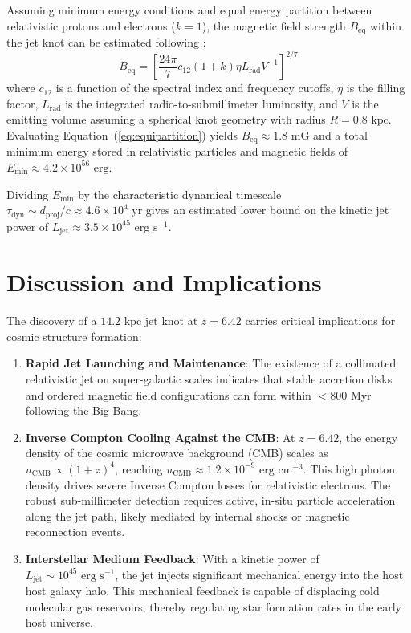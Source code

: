 \documentclass[twocolumn]{aastex631}
\begin{document}
Assuming minimum energy conditions and equal energy partition between relativistic protons and electrons ($k = 1$), the magnetic field strength $B_{\mathrm{eq}}$ within the jet knot can be estimated following \citet{Thorne2025}:
\begin{equation} \label{eq:equipartition}
B_{\mathrm{eq}} = \left[ \frac{24\pi}{7} c_{12} (1+k) \eta L_{\mathrm{rad}} V^{-1} \right]^{2/7}
\end{equation}
where $c_{12}$ is a function of the spectral index and frequency cutoffs, $\eta$ is the filling factor, $L_{\mathrm{rad}}$ is the integrated radio-to-submillimeter luminosity, and $V$ is the emitting volume assuming a spherical knot geometry with radius $R = 0.8\text{ kpc}$. Evaluating Equation~(\ref{eq:equipartition}) yields $B_{\mathrm{eq}} \approx 1.8\text{ mG}$ and a total minimum energy stored in relativistic particles and magnetic fields of $E_{\mathrm{min}} \approx 4.2 \times 10^{56}\text{ erg}$.

Dividing $E_{\mathrm{min}}$ by the characteristic dynamical timescale $\tau_{\mathrm{dyn}} \sim d_{\mathrm{proj}} / c \approx 4.6 \times 10^4\text{ yr}$ gives an estimated lower bound on the kinetic jet power of $L_{\mathrm{jet}} \approx 3.5 \times 10^{45}\text{ erg s}^{-1}$.

\section{Discussion and Implications} \label{sec:discussion}

The discovery of a $14.2\text{ kpc}$ jet knot at $z = 6.42$ carries critical implications for cosmic structure formation:

\begin{enumerate}
\item \textbf{Rapid Jet Launching and Maintenance}: The existence of a collimated relativistic jet on super-galactic scales indicates that stable accretion disks and ordered magnetic field configurations can form within $< 800\text{ Myr}$ following the Big Bang.
\item \textbf{Inverse Compton Cooling Against the CMB}: At $z = 6.42$, the energy density of the cosmic microwave background (CMB) scales as $u_{\mathrm{CMB}} \propto (1+z)^4$, reaching $u_{\mathrm{CMB}} \approx 1.2 \times 10^{-9}\text{ erg cm}^{-3}$. This high photon density drives severe Inverse Compton losses for relativistic electrons. The robust sub-millimeter detection requires active, in-situ particle acceleration along the jet path, likely mediated by internal shocks or magnetic reconnection events.
\item \textbf{Interstellar Medium Feedback}: With a kinetic power of $L_{\mathrm{jet}} \sim 10^{45}\text{ erg s}^{-1}$, the jet injects significant mechanical energy into the host host galaxy halo. This mechanical feedback is capable of displacing cold molecular gas reservoirs, thereby regulating star formation rates in the early host universe.
\end{enumerate}
\end{document}
